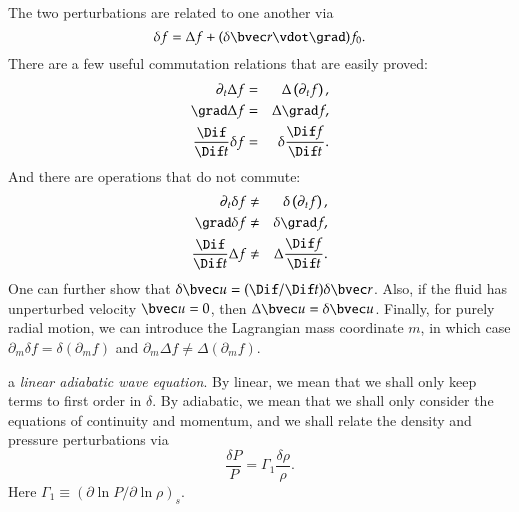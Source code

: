 The two perturbations are related to one another via
\begin{equation}
\delta f = \Delta f + (\delta\vr\vdot\grad)f_{0}.
\end{equation}
There are a few useful commutation relations that are easily proved:
\begin{eqnarray}
\partial_{t}\Delta f &=& \Delta\left(\partial_{t}f\right),\\
\grad \Delta f &=& \Delta \grad f,\\
\frac{\Dif}{\Dif t}\delta f &=& \delta \frac{\Dif f}{\Dif t}.
\end{eqnarray}
And there are operations that do not commute:
\begin{eqnarray}
\partial_{t}\delta f &\neq& \delta\left(\partial_{t}f\right),\\
\grad \delta f &\neq& \delta \grad f,\\
\frac{\Dif}{\Dif t}\Delta f &\neq& \Delta \frac{\Dif f}{\Dif t}.
\end{eqnarray}
One can further show that $\delta\vu = (\Dif/\Dif t)\delta \vr$. Also, if the fluid has unperturbed velocity $\vu = 0$, then $\Delta \vu = \delta \vu$.  Finally, for purely radial motion, we can introduce the Lagrangian mass coordinate $m$, in which case $\partial_{m}\delta f = \delta(\partial_{m}f)$ and $\partial_{m}\Delta f \neq \Delta(\partial_{m}f)$.

 a \emph{linear adiabatic wave equation}. By linear, we mean that we shall only keep terms to first order in $\delta$.  By adiabatic, we mean that we shall only consider the equations of continuity and momentum, and we shall relate the density and pressure perturbations via
\begin{equation}\label{e.adiabatic-condition}
 \frac{\delta P}{P} = \Gamma_{1}\frac{\delta \rho}{\rho}.
\end{equation}
Here $\Gamma_{1}\equiv \left(\partial\ln P/\partial\ln\rho\right)_{s}$.

